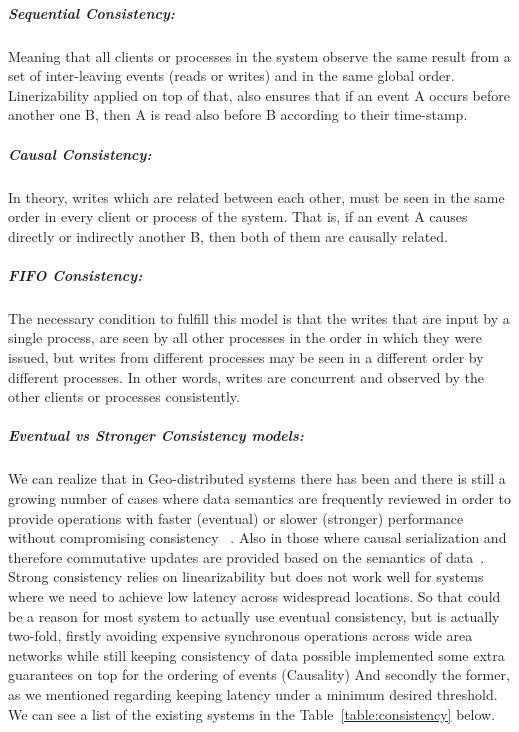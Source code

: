		\subparagraph{Sequential Consistency:}
		Meaning that all clients or processes in the system observe the same result from a set of inter-leaving events (reads or writes) and in the same global order. Linerizability applied on top of that, also ensures that if an event A occurs before another one B, then A is read also before B according to their time-stamp.

		\subparagraph{Causal Consistency:}
		In theory, writes which are related between each other, must be seen in the same order in every client or process of the system. That is, if an event A causes directly or indirectly another B, then both of them are causally related.

		\subparagraph{FIFO Consistency:}
	The necessary condition to fulfill this model is that the writes that are input by a single process, are seen by all other processes in the order in which they were issued, but writes from different processes may be seen in a different order by different processes. In other words, writes are concurrent and observed by the other clients or processes consistently.
	
		\subparagraph{Eventual vs Stronger Consistency models:}
		We can realize that in Geo-distributed systems there has been and there is still a growing number of cases where data semantics are frequently reviewed in order to provide operations with faster (eventual) or slower (stronger) performance without compromising consistency ~\cite{Li:2012}. Also in those where causal serialization and therefore commutative updates are provided based on the semantics of data~\cite{Saphiro:2011}. Strong consistency relies on linearizability but does not work well for systems where we need to achieve low latency across widespread locations. So that could be a reason for most system to actually use eventual consistency, but is actually two-fold, firstly avoiding expensive synchronous operations across wide area networks while still keeping consistency of data possible implemented some extra guarantees on top for the ordering of events (Causality) And secondly the former, as we mentioned regarding keeping latency under a minimum desired threshold. We can see a list of the existing systems in the Table~\ref{table:consistency} below.
		
